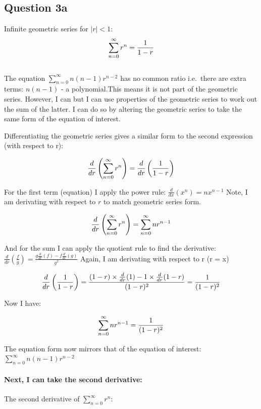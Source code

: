 \documentclass[
]{article}
\begin{document}
\subsection{Question 3a}\label{question-3a}

Infinite geometric series for \(|r| < 1\):\\
\[
\Large 
\sum_{n=0}^{\infty}r^n=\frac{1}{1-r} 
\]\\

The equation \(\sum_{n=0}^{\infty}n(n-1)r^{n-2}\) has no common ratio
i.e.~there are extra terms: \(n(n-1)\) - a polynomial.This means it is
not part of the geometric series. However, I can but I can use
properties of the geometric series to work out the sum of the latter. I
can do so by altering the geometric series to take the same form of the
equation of interest.

Differentiating the geometric series gives a similar form to the second
expression (with respect to r):

\[
\Large
\frac{d}{dr} \left( \sum_{n=0}^{\infty} r^n \right) = \frac{d}{dr} \left( \frac{1}{1 - r} \right)
\]

For the first term (equation) I apply the power rule:
\(\frac{d}{dx} \left( x^n \right) = n x^{n-1}\) Note, I am derivating
with respect to \(r\) to match geometric series form.

\[
\Large
\frac{d}{dr} \left( \sum_{n=0}^{\infty} r^n \right) =
\sum_{n=0}^{\infty} nr^{n-1}
\]

And for the sum I can apply the quotient rule to find the derivative:
\(\frac{d}{dr} \left( \frac{f}{g} \right) = \frac{g \frac{d}{dr}(f) - f \frac{d}{dr}(g)}{g^2}\)
Again, I am derivating with respect to r (r = x)

\[
\Large
 \frac{d}{dr} \left( \frac{1}{1 - r} \right) = \frac{(1-r)\times\frac{d}{dr}(1)-1 \times \frac{d}{dr}(1-r)}{(1-r)^2}
 = \frac{1}{(1-r)^2}
\]

Now I have:

\[
\Large
\sum_{n=0}^{\infty} nr^{n-1} = \frac{1}{(1-r)^2}
\]

The equation form now mirrors that of the equation of interest:
\(\sum_{n=0}^{\infty}n(n-1)r^{n-2}\)

\paragraph{Next, I can take the second
derivative:}\label{next-i-can-take-the-second-derivative}

The second derivative of \(\sum_{n=0}^{\infty}r^n\):
\end{document}
